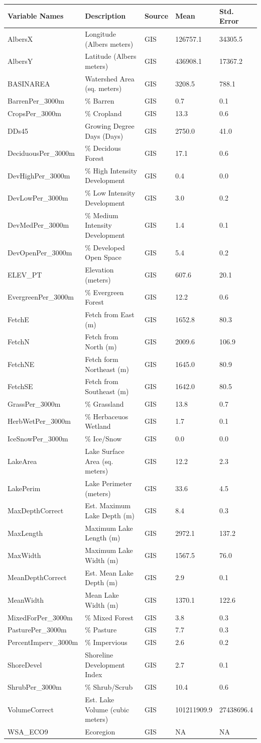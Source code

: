 \documentclass[12pt,]{article}
\begin{document}
\begin{longtable}[c]{@{}lllll@{}}
\toprule
Variable Names & Description & Source & Mean & Std. Error\tabularnewline
\midrule
\endhead
AlbersX & Longitude (Albers meters) & GIS & 126757.1 &
34305.5\tabularnewline
AlbersY & Latitude (Albers meters) & GIS & 436908.1 &
17367.2\tabularnewline
BASINAREA & Watershed Area (sq. meters) & GIS & 3208.5 &
788.1\tabularnewline
BarrenPer\_3000m & \% Barren & GIS & 0.7 & 0.1\tabularnewline
CropsPer\_3000m & \% Cropland & GIS & 13.3 & 0.6\tabularnewline
DDs45 & Growing Degree Days (Days) & GIS & 2750.0 & 41.0\tabularnewline
DeciduousPer\_3000m & \% Decidous Forest & GIS & 17.1 &
0.6\tabularnewline
DevHighPer\_3000m & \% High Intensity Development & GIS & 0.4 &
0.0\tabularnewline
DevLowPer\_3000m & \% Low Intensity Development & GIS & 3.0 &
0.2\tabularnewline
DevMedPer\_3000m & \% Medium Intensity Development & GIS & 1.4 &
0.1\tabularnewline
DevOpenPer\_3000m & \% Developed Open Space & GIS & 5.4 &
0.2\tabularnewline
ELEV\_PT & Elevation (meters) & GIS & 607.6 & 20.1\tabularnewline
EvergreenPer\_3000m & \% Evergreen Forest & GIS & 12.2 &
0.6\tabularnewline
FetchE & Fetch from East (m) & GIS & 1652.8 & 80.3\tabularnewline
FetchN & Fetch from North (m) & GIS & 2009.6 & 106.9\tabularnewline
FetchNE & Fetch form Northeast (m) & GIS & 1645.0 & 80.9\tabularnewline
FetchSE & Fetch from Southeast (m) & GIS & 1642.0 & 80.5\tabularnewline
GrassPer\_3000m & \% Grassland & GIS & 13.8 & 0.7\tabularnewline
HerbWetPer\_3000m & \% Herbaceuos Wetland & GIS & 1.7 &
0.1\tabularnewline
IceSnowPer\_3000m & \% Ice/Snow & GIS & 0.0 & 0.0\tabularnewline
LakeArea & Lake Surface Area (sq. meters) & GIS & 12.2 &
2.3\tabularnewline
LakePerim & Lake Perimeter (meters) & GIS & 33.6 & 4.5\tabularnewline
MaxDepthCorrect & Est. Maximum Lake Depth (m) & GIS & 8.4 &
0.3\tabularnewline
MaxLength & Maximum Lake Length (m) & GIS & 2972.1 &
137.2\tabularnewline
MaxWidth & Maximum Lake Width (m) & GIS & 1567.5 & 76.0\tabularnewline
MeanDepthCorrect & Est. Mean Lake Depth (m) & GIS & 2.9 &
0.1\tabularnewline
MeanWidth & Mean Lake Width (m) & GIS & 1370.1 & 122.6\tabularnewline
MixedForPer\_3000m & \% Mixed Forest & GIS & 3.8 & 0.3\tabularnewline
PasturePer\_3000m & \% Pasture & GIS & 7.7 & 0.3\tabularnewline
PercentImperv\_3000m & \% Impervious & GIS & 2.6 & 0.2\tabularnewline
ShoreDevel & Shoreline Development Index & GIS & 2.7 &
0.1\tabularnewline
ShrubPer\_3000m & \% Shrub/Scrub & GIS & 10.4 & 0.6\tabularnewline
VolumeCorrect & Est. Lake Volume (cubic meters) & GIS & 101211909.9 &
27438696.4\tabularnewline
WSA\_ECO9 & Ecoregion & GIS & NA & NA\tabularnewline

\end{longtable}
\end{document}
